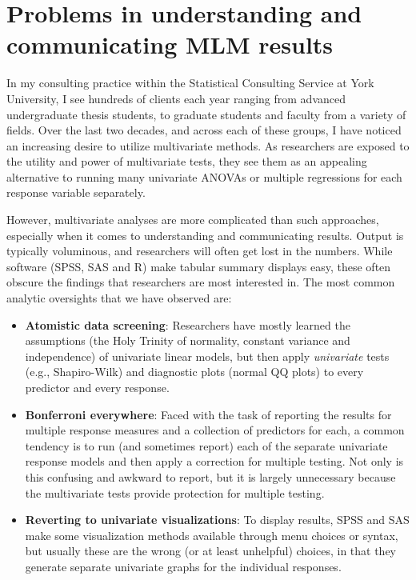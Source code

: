 \documentclass[
  letterpaper,
  10pt,
  krantz2]{krantz}
\begin{document}
\section{Problems in understanding and communicating MLM
results}\label{sec-problems}

In my consulting practice within the Statistical Consulting Service at
York University, I see hundreds of clients each year ranging from
advanced undergraduate thesis students, to graduate students and faculty
from a variety of fields. Over the last two decades, and across each of
these groups, I have noticed an increasing desire to utilize
multivariate methods. As researchers are exposed to the utility and
power of multivariate tests, they see them as an appealing alternative
to running many univariate ANOVAs or multiple regressions for each
response variable separately.

However, multivariate analyses are more complicated than such
approaches, especially when it comes to understanding and communicating
results. Output is typically voluminous, and researchers will often get
lost in the numbers. While software (SPSS, SAS and R) make tabular
summary displays easy, these often obscure the findings that researchers
are most interested in. The most common analytic oversights that we have
observed are:

\begin{itemize}
\item
  \textbf{Atomistic data screening}: Researchers have mostly learned the
  assumptions (the Holy Trinity of normality, constant variance and
  independence) of univariate linear models, but then apply
  \emph{univariate} tests (e.g., Shapiro-Wilk) and diagnostic plots
  (normal QQ plots) to every predictor and every response.
\item
  \textbf{Bonferroni everywhere}: Faced with the task of reporting the
  results for multiple response measures and a collection of predictors
  for each, a common tendency is to run (and sometimes report) each of
  the separate univariate response models and then apply a correction
  for multiple testing. Not only is this confusing and awkward to
  report, but it is largely unnecessary because the multivariate tests
  provide protection for multiple testing.
\item
  \textbf{Reverting to univariate visualizations}: To display results,
  SPSS and SAS make some visualization methods available through menu
  choices or syntax, but usually these are the wrong (or at least
  unhelpful) choices, in that they generate separate univariate graphs
  for the individual responses.
\end{itemize}
\end{document}
